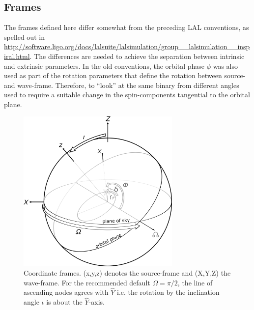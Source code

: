 \documentclass[11pt,tightenlines,article,amssymb,amsmath,amsfonts,superscriptaddress]{revtex4}
\newcommand{\EyW}{\hat Y}
\begin{document}


\subsection{Frames}
\label{sec:Frames}

The frames defined here differ somewhat from the preceding LAL
conventions, as spelled out in
\url{http://software.ligo.org/docs/lalsuite/lalsimulation/group__lalsimulation__inspiral.html}.
The differences are needed to achieve the separation between intrinsic
and extrinsic parameters.  In the old conventions, the orbital phase
$\phi$ was also used as part of the rotation parameters that define
the rotation between source- and wave-frame.  Therefore, to ``look''
at the same binary from different angles used to require a suitable
change in the spin-components tangential to the orbital plane.


\begin{figure}
  \includegraphics[width=80mm]{NRinj_orbitalelements.png}
  \caption{
  \label{fig:frames} Coordinate frames.
  (x,y,z) denotes the source-frame and (X,Y,Z) the wave-frame. For the recommended default
    $\Omega=\pi/2$, the line of ascending nodes agrees with $\EyW$
    i.e. the rotation by the inclination angle $\iota$ is about the
    $\EyW$-axis.}
  \end{figure}
\end{document}
